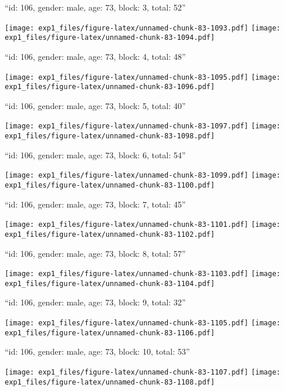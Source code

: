 \documentclass[11pt,,]{article}
\begin{document}
\newpage
[1] 

``id: 106, gender: male, age: 73, block: 3, total: 52''

\texttt{[image: exp1\_files/figure-latex/unnamed-chunk-83-1093.pdf]}
\texttt{[image: exp1\_files/figure-latex/unnamed-chunk-83-1094.pdf]}

\newpage
[1] 

``id: 106, gender: male, age: 73, block: 4, total: 48''

\texttt{[image: exp1\_files/figure-latex/unnamed-chunk-83-1095.pdf]}
\texttt{[image: exp1\_files/figure-latex/unnamed-chunk-83-1096.pdf]}

\newpage
[1] 

``id: 106, gender: male, age: 73, block: 5, total: 40''

\texttt{[image: exp1\_files/figure-latex/unnamed-chunk-83-1097.pdf]}
\texttt{[image: exp1\_files/figure-latex/unnamed-chunk-83-1098.pdf]}

\newpage
[1] 

``id: 106, gender: male, age: 73, block: 6, total: 54''

\texttt{[image: exp1\_files/figure-latex/unnamed-chunk-83-1099.pdf]}
\texttt{[image: exp1\_files/figure-latex/unnamed-chunk-83-1100.pdf]}

\newpage
[1] 

``id: 106, gender: male, age: 73, block: 7, total: 45''

\texttt{[image: exp1\_files/figure-latex/unnamed-chunk-83-1101.pdf]}
\texttt{[image: exp1\_files/figure-latex/unnamed-chunk-83-1102.pdf]}

\newpage
[1] 

``id: 106, gender: male, age: 73, block: 8, total: 57''

\texttt{[image: exp1\_files/figure-latex/unnamed-chunk-83-1103.pdf]}
\texttt{[image: exp1\_files/figure-latex/unnamed-chunk-83-1104.pdf]}

\newpage
[1] 

``id: 106, gender: male, age: 73, block: 9, total: 32''

\texttt{[image: exp1\_files/figure-latex/unnamed-chunk-83-1105.pdf]}
\texttt{[image: exp1\_files/figure-latex/unnamed-chunk-83-1106.pdf]}

\newpage
[1] 

``id: 106, gender: male, age: 73, block: 10, total: 53''

\texttt{[image: exp1\_files/figure-latex/unnamed-chunk-83-1107.pdf]}
\texttt{[image: exp1\_files/figure-latex/unnamed-chunk-83-1108.pdf]}
\end{document}
